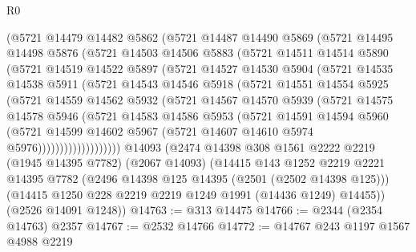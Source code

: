 \begin{lexlean}{R0}
\begin{coremodule}
        (@5721
          @14479
          @14482
          @5862
          (@5721
            @14487
            @14490
            @5869
            (@5721
              @14495
              @14498
              @5876
              (@5721
                @14503
                @14506
                @5883
                (@5721
                  @14511
                  @14514
                  @5890
                  (@5721
                    @14519
                    @14522
                    @5897
                    (@5721
                      @14527
                      @14530
                      @5904
                      (@5721
                        @14535
                        @14538
                        @5911
                        (@5721
                          @14543
                          @14546
                          @5918
                          (@5721
                            @14551
                            @14554
                            @5925
                            (@5721
                              @14559
                              @14562
                              @5932
                              (@5721
                                @14567
                                @14570
                                @5939
                                (@5721
                                  @14575
                                  @14578
                                  @5946
                                  (@5721
                                    @14583
                                    @14586
                                    @5953
                                    (@5721
                                      @14591
                                      @14594
                                      @5960
                                      (@5721
                                        @14599
                                        @14602
                                        @5967
                                        (@5721 @14607 @14610 @5974 @5976)))))))))))))))))))
    @14093
    (@2474
      @14398
      @308
      @1561
      @2222
      @2219
      (@1945 @14395 @7782)
      (@2067 @14093)
      (@14415
        @143
        @1252
        @2219
        @2221
        @14395
        @7782
        (@2496 @14398 @125 @14395 (@2501 (@2502 @14398 @125)))
        (@14415 @1250 @228 @2219 @2219 @1249 @1991 (@14436 @1249) @14455))
      (@2526 @14091 @1248))
@14763 := @313 @14475
@14766 := @2344 (@2354 @14763) @2357
@14767 := @2532 @14766
@14772 := @14767 @243 @1197 @1567 @4988 @2219

\end{coremodule}
\end{lexlean}
